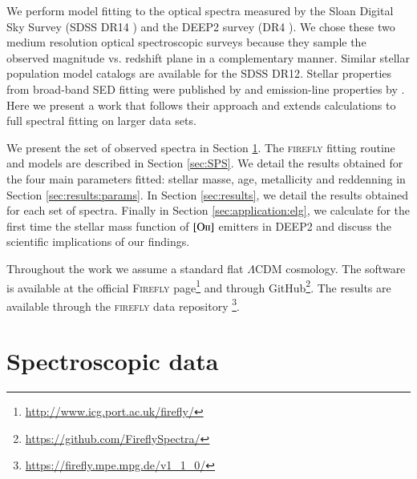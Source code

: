\documentclass[onecolumn]{aa}
\newcommand{\OII}{$\left[\mathrm{O\textrm{\textsc{ii}}}\right]$\xspace}
\begin{document}
We perform model fitting to the optical spectra measured by the Sloan Digital Sky Survey (SDSS DR14 \citealt{SDSS_DR14}) and the DEEP2 survey (DR4 \citealt{Newman_2013}). 
We chose these two medium resolution optical spectroscopic surveys because they sample the observed magnitude vs. redshift plane in a complementary manner.%
Similar stellar population model catalogs are available for the SDSS DR12. Stellar properties from broad-band SED fitting were published by \citet{Maraston2013} and emission-line properties by \citet{Thomas2013a}. Here we present a work that follows their approach and extends calculations to full spectral fitting on larger data sets. 

We present the set of observed spectra in Section \ref{sec:DATA}. 
The \textsc{firefly} fitting routine and models are described in Section \ref{sec:SPS}. 
We detail the results obtained for the four main parameters fitted: stellar masse, age, metallicity and reddenning in Section \ref{sec:results:params}. 
In Section \ref{sec:results}, we detail the results obtained for each set of spectra. 
Finally in Section \ref{sec:application:elg}, we calculate for the first time the stellar mass function of \OII emitters in DEEP2 and discuss the scientific implications of our findings.

Throughout the work we assume a standard flat $\Lambda$CDM \citep{Planck_2014} cosmology. 
The software is available at the official \textsc{Firefly} page\footnote{\url{http://www.icg.port.ac.uk/firefly/}} and through GitHub\footnote{\url{https://github.com/FireflySpectra/}}.
The results are available through the \textsc{firefly} data repository
\footnote{\url{https://firefly.mpe.mpg.de/v1_1_0/}}.


\clearpage
\section{Spectroscopic data}
\label{sec:DATA}
\end{document}
